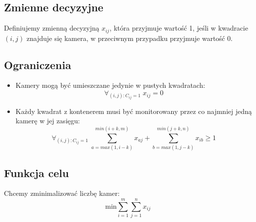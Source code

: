 \documentclass{article}
\begin{document}
\subsection{Zmienne decyzyjne}
Definiujemy zmienną decyzyjną $x_{ij}$, która przyjmuje wartość 1, jeśli w kwadracie $(i, j)$ znajduje się kamera, w przeciwnym przypadku przyjmuje wartość 0.
\subsection{Ograniczenia}
\begin{itemize}
    \item Kamery mogą być umieszczane jedynie w pustych kwadratach:
    \[\forall_{(i, j): C_{ij} = 1} \; x_{ij} = 0\]
    \item Każdy kwadrat z kontenerem musi być monitorowany przez co najmniej jedną kamerę w jej zasięgu:
    \[\forall_{(i, j): C_{ij} = 1} \; \sum_{a = max(1, i - k)}^{min(i + k, m)} x_{aj} + \sum_{b = max(1, j - k)}^{min(j + k, n)} x_{ib} \geq 1\]
\end{itemize}
\subsection{Funkcja celu}
Chcemy zminimalizować liczbę kamer:
\[\text{min} \sum_{i = 1}^m \sum_{j = 1}^n x_{ij}\]
\end{document}
